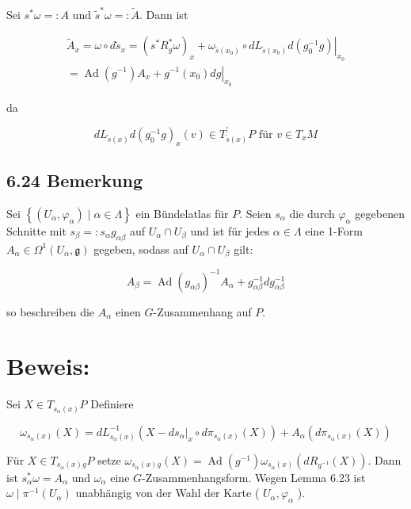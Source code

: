 Sei $s^{*} \omega=: A$ und $\tilde{s}^{*} \omega=: \tilde{A}$. Dann ist

$$
\begin{gathered}
\tilde{A}_{x}=\omega \circ d \tilde{s}_{x}=\left(s^{*} R_{g}^{*} \omega\right)_{x}+\left.\omega_{\tilde{s}\left(x_{0}\right)} \circ d L_{\tilde{s}\left(x_{0}\right)} d\left(g_{0}^{-1} g\right)\right|_{x_{0}} \\
=\operatorname{Ad}\left(g^{-1}\right) A_{x}+\left.g^{-1}\left(x_{0}\right) d g\right|_{x_{0}}
\end{gathered}
$$

da

$$
d L_{\tilde{s}(x)} d\left(g_{0}^{-1} g\right)_{x}(v) \in T_{\tilde{s}(x)}^{\prime} P \text { für } v \in T_{x} M
$$

\subsection*{6.24 Bemerkung}
Sei $\left\{\left(U_{\alpha}, \varphi_{\alpha}\right) \mid \alpha \in \Lambda\right\}$ ein Bündelatlas für $P$. Seien $s_{\alpha}$ die durch $\varphi_{\alpha}$ gegebenen Schnitte mit $s_{\beta}=: s_{\alpha} g_{\alpha \beta}$ auf $U_{\alpha} \cap U_{\beta}$ und ist für jedes $\alpha \in \Lambda$ eine 1-Form $A_{\alpha} \in \Omega^{1}\left(U_{\alpha}, \mathfrak{g}\right)$ gegeben, sodass auf $U_{\alpha} \cap U_{\beta}$ gilt:

$$
A_{\beta}=\operatorname{Ad}\left(g_{\alpha \beta}\right)^{-1} A_{\alpha}+g_{\alpha \beta}^{-1} d g_{\alpha \beta}^{-1}
$$

so beschreiben die $A_{\alpha}$ einen $G$-Zusammenhang auf $P$.

\section*{Beweis:}
Sei $X \in T_{s_{\alpha}(x)} P$ Definiere

$$
\omega_{s_{\alpha}(x)}(X)=d L_{s_{\alpha}(x)}^{-1}\left(X-\left.d s_{\alpha}\right|_{x} \circ d \pi_{s_{\alpha}(x)}(X)\right)+A_{\alpha}\left(d \pi_{s_{\alpha}(x)}(X)\right)
$$

Für $X \in T_{s_{\alpha}(x) g} P$ setze $\omega_{s_{\alpha}(x) g}(X)=\operatorname{Ad}\left(g^{-1}\right) \omega_{s_{\alpha}(x)}\left(d R_{g^{-1}}(X)\right)$. Dann ist $s_{\alpha}^{*} \omega=A_{\alpha}$ und $\omega_{\alpha}$ eine $G$-Zusammenhangsform. Wegen Lemma 6.23 ist $\omega \mid \pi^{-1}\left(U_{\alpha}\right)$ unabhängig von der Wahl der Karte ( $U_{\alpha}, \varphi_{\alpha}$ ).

